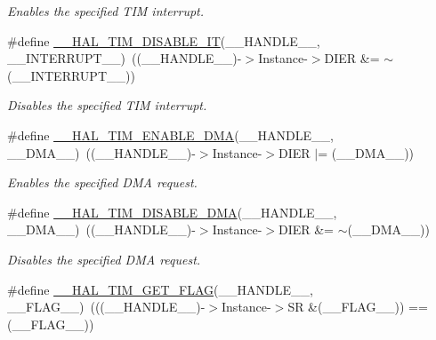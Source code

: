 \begin{DoxyCompactItemize}
\begin{DoxyCompactList}\small\item\em Enables the specified T\-I\-M interrupt. \end{DoxyCompactList}\item 
\#define \hyperlink{group___t_i_m___exported___macros_ga31d67e905bc62e3142179dc4bbf8ba64}{\-\_\-\-\_\-\-H\-A\-L\-\_\-\-T\-I\-M\-\_\-\-D\-I\-S\-A\-B\-L\-E\-\_\-\-I\-T}(\-\_\-\-\_\-\-H\-A\-N\-D\-L\-E\-\_\-\-\_\-, \-\_\-\-\_\-\-I\-N\-T\-E\-R\-R\-U\-P\-T\-\_\-\-\_\-)~((\-\_\-\-\_\-\-H\-A\-N\-D\-L\-E\-\_\-\-\_\-)-\/$>$Instance-\/$>$D\-I\-E\-R \&= $\sim$(\-\_\-\-\_\-\-I\-N\-T\-E\-R\-R\-U\-P\-T\-\_\-\-\_\-))
\begin{DoxyCompactList}\small\item\em Disables the specified T\-I\-M interrupt. \end{DoxyCompactList}\item 
\#define \hyperlink{group___t_i_m___exported___macros_gabb91ccd46cd7204c87170a1ea5b38135}{\-\_\-\-\_\-\-H\-A\-L\-\_\-\-T\-I\-M\-\_\-\-E\-N\-A\-B\-L\-E\-\_\-\-D\-M\-A}(\-\_\-\-\_\-\-H\-A\-N\-D\-L\-E\-\_\-\-\_\-, \-\_\-\-\_\-\-D\-M\-A\-\_\-\-\_\-)~((\-\_\-\-\_\-\-H\-A\-N\-D\-L\-E\-\_\-\-\_\-)-\/$>$Instance-\/$>$D\-I\-E\-R $\vert$= (\-\_\-\-\_\-\-D\-M\-A\-\_\-\-\_\-))
\begin{DoxyCompactList}\small\item\em Enables the specified D\-M\-A request. \end{DoxyCompactList}\item 
\#define \hyperlink{group___t_i_m___exported___macros_ga1a6e8b19efd23fd0295802d904c4702f}{\-\_\-\-\_\-\-H\-A\-L\-\_\-\-T\-I\-M\-\_\-\-D\-I\-S\-A\-B\-L\-E\-\_\-\-D\-M\-A}(\-\_\-\-\_\-\-H\-A\-N\-D\-L\-E\-\_\-\-\_\-, \-\_\-\-\_\-\-D\-M\-A\-\_\-\-\_\-)~((\-\_\-\-\_\-\-H\-A\-N\-D\-L\-E\-\_\-\-\_\-)-\/$>$Instance-\/$>$D\-I\-E\-R \&= $\sim$(\-\_\-\-\_\-\-D\-M\-A\-\_\-\-\_\-))
\begin{DoxyCompactList}\small\item\em Disables the specified D\-M\-A request. \end{DoxyCompactList}\item 
\#define \hyperlink{group___t_i_m___exported___macros_ga96d98c66ad9d85f00c148de99888ef19}{\-\_\-\-\_\-\-H\-A\-L\-\_\-\-T\-I\-M\-\_\-\-G\-E\-T\-\_\-\-F\-L\-A\-G}(\-\_\-\-\_\-\-H\-A\-N\-D\-L\-E\-\_\-\-\_\-, \-\_\-\-\_\-\-F\-L\-A\-G\-\_\-\-\_\-)~(((\-\_\-\-\_\-\-H\-A\-N\-D\-L\-E\-\_\-\-\_\-)-\/$>$Instance-\/$>$S\-R \&(\-\_\-\-\_\-\-F\-L\-A\-G\-\_\-\-\_\-)) == (\-\_\-\-\_\-\-F\-L\-A\-G\-\_\-\-\_\-))

\end{DoxyCompactItemize}
